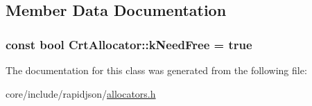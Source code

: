 \subsection{Member Data Documentation}
\subsubsection[{\texorpdfstring{k\+Need\+Free}{kNeedFree}}]{\setlength{\rightskip}{0pt plus 5cm}const bool Crt\+Allocator\+::k\+Need\+Free = true\hspace{0.3cm}{\ttfamily [static]}}\hypertarget{classCrtAllocator_ac7df8398c529290f0cd5950d9492f524}{}\label{classCrtAllocator_ac7df8398c529290f0cd5950d9492f524}


The documentation for this class was generated from the following file\+:\begin{DoxyCompactItemize}
\item 
core/include/rapidjson/\hyperlink{allocators_8h}{allocators.\+h}\end{DoxyCompactItemize}
